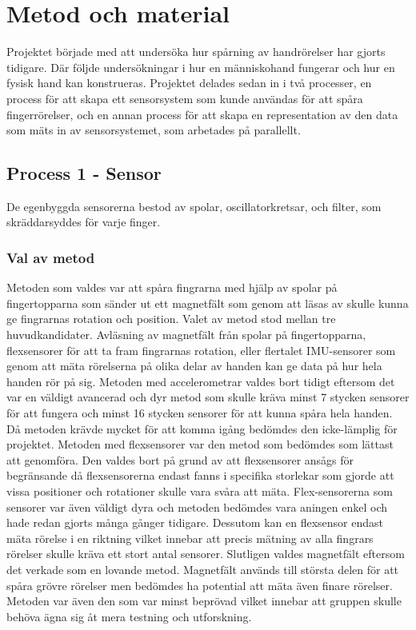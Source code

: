 \documentclass[a4paper]{article}
\makeatletter
\let\\\@raggedtwoe@savedcr%
\makeatother
\begin{document}
\begin{sloppypar}
    \newpage
    \section{Metod och material}


    Projektet började med att undersöka hur spårning av handrörelser har gjorts tidigare.
    Där följde undersökningar i hur en människohand fungerar och hur en fysisk hand kan konstrueras.
    Projektet delades sedan in i två processer, en process för att skapa ett sensorsystem som kunde användas för att spåra fingerrörelser,
    och en annan process för att skapa en representation av den data som mäts in av sensorsystemet, som arbetades på parallellt.

    \subsection{Process 1 - Sensor}
    De egenbyggda sensorerna bestod av spolar, oscillatorkretsar, och filter, som skräddarsyddes för varje finger.
    \subsubsection{Val av metod}
    Metoden som valdes var att spåra fingrarna med hjälp av spolar på fingertopparna som
    sänder ut ett magnetfält som genom att läsas av skulle kunna ge fingrarnas rotation
    och position. Valet av metod stod mellan tre huvudkandidater. Avläsning av magnetfält
    från spolar på fingertopparna, flexsensorer för att ta fram fingrarnas rotation, eller
    flertalet IMU-sensorer som genom att mäta rörelserna på olika delar av handen kan
    ge data på hur hela handen rör på sig.
    \\\\
    Metoden med accelerometrar valdes bort tidigt eftersom det var en väldigt avancerad och
    dyr metod som skulle kräva minst 7 stycken sensorer för att fungera och minst 16 stycken
    sensorer för att kunna spåra hela handen. Då metoden krävde mycket för att komma
    igång bedömdes den icke-lämplig för projektet.
    \\\\
    Metoden med flexsensorer var den metod som bedömdes som lättast att genomföra. Den
    valdes bort på grund av att flexsensorer ansågs för begränsande då flexsensorerna
    endast fanns i specifika storlekar som gjorde att vissa positioner och rotationer
    skulle vara svåra att mäta. Flex-sensorerna som sensorer var även väldigt dyra och
    metoden bedömdes vara aningen enkel och hade redan gjorts många gånger tidigare.
    Dessutom kan en flexsensor endast mäta rörelse i en riktning vilket innebar att
    precis mätning av alla fingrars rörelser skulle kräva ett stort antal sensorer.
    \\\\
    Slutligen valdes magnetfält eftersom det verkade som en lovande metod. Magnetfält
    används till största delen för att spåra grövre rörelser men bedömdes ha potential
    att mäta även finare rörelser. Metoden var även den som var minst beprövad vilket
    innebar att gruppen skulle behöva ägna sig åt mera testning och utforskning.





\end{sloppypar}
\end{document}
